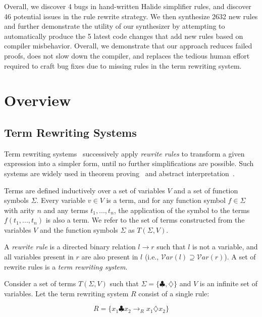 \documentclass[sigplan,10pt,review,anonymous]{acmart}\settopmatter{printfolios=true,printccs=false,printacmref=false}
\newcommand{\NumRulesFixed}{{\color{red} 4}\xspace}
\newcommand{\NumOrderingProblems}{{\color{red} 46}\xspace}
\newcommand{\NumRulesSynthesized}{{\color{red} 2632}\xspace}
\newcommand{\NumBugsAutomated}{{\color{red} 5}\xspace}
\begin{document}
Overall, we discover \NumRulesFixed bugs in hand-written Halide simplifier rules, and discover \NumOrderingProblems
potential issues in the rule rewrite strategy.  We then synthesize \NumRulesSynthesized new rules 
and further demonstrate the utility of our synthesizer by attempting to
automatically produce the \NumBugsAutomated latest code changes that add new
rules based on compiler misbehavior.
Overall, we demonstrate that our approach
reduces failed proofs,  does not slow down the compiler, and replaces the
tedious human effort required to craft bug fixes due to missing rules in the
term rewriting system.

\section{Overview}
\subsection{Term Rewriting Systems}
Term rewriting systems~\cite{gorn1967} successively apply \textit{rewrite rules} to transform a given
expression into a simpler form, until no further simplifications are possible.  Such systems are widely
used in theorem proving~\cite{} and abstract interpretation~\cite{}.

Terms are defined inductively over a set of variables $V$ and a set of function symbols $\Sigma$. Every variable $v \in V$ is a term, and for any function symbol $f \in \Sigma$ with arity $n$ and any terms $t_1, ..., t_n$, the application of the symbol to the terms $f(t_1, ..., t_n)$ is also a term. We refer to the set of terms constructed from the variables $V$ and the function symbols $\Sigma$ as $T(\Sigma, V)$.

A \emph{rewrite rule} is a directed binary relation $l \rightarrow r$ such that $l$ is not a variable, and all variables present in $r$ are also present in $l$ (i.e., $\mathcal{V}ar(l) \supseteq \mathcal{V}ar(r)$). A set of rewrite rules is a \emph{term rewriting system}.

Consider a set of terms $T(\Sigma, V)$ such that $\Sigma = \{\clubsuit, \diamondsuit\}$ and $V$ is an infinite set of variables. Let the term rewriting system $R$ consist of a single rule:

\[ R = \{ x_1 \clubsuit x_2 \rightarrow_R x_1 \diamondsuit x_2 \} \]
\end{document}
